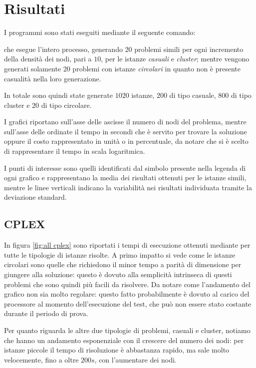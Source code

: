 \section{Risultati}
\label{sec:risultati}
I programmi sono stati eseguiti mediante il seguente comando:
\begin{quotation}
\end{quotation}
che esegue l'intero processo, generando 20 problemi simili per ogni incremento della densità dei nodi, pari a $10$, per le istanze \emph{casuali} e \emph{cluster}; mentre vengono generati solamente 20 problemi con istanze \emph{circolari} in quanto non è presente casualità nella loro generazione.

In totale sono quindi state generate $1020$ istanze, $200$ di tipo casuale, $800$ di tipo cluster e $20$ di tipo circolare.

I grafici riportano sull'asse delle ascisse il numero di nodi del problema, mentre sull'asse delle ordinate il tempo in secondi che è servito per trovare la soluzione oppure il costo rappresentato in unità o in percentuale, da notare che si è scelto di rappresentare il tempo in scala logaritmica.


I punti di interesse sono quelli identificati dal simbolo presente nella legenda di ogni grafico e rappresentano la media dei risultati ottenuti per le istanze simili, mentre le linee verticali indicano la variabilità nei risultati individuata tramite la deviazione standard.

\subsection{CPLEX}

In figura \ref{fig:all cplex} sono riportati i tempi di esecuzione ottenuti mediante  per tutte le tipologie di istanze risolte.
A primo impatto si vede come le istanze circolari sono quelle che richiedono il minor tempo a parità di dimensione per giungere alla soluzione: questo è dovuto alla semplicità intrinseca di questi problemi che sono quindi più facili da risolvere.
Da notare come l'andamento del grafico non sia molto regolare: questo fatto probabilmente è dovuto al carico del processore al momento dell'esecuzione del test, che può non essere stato costante durante il periodo di prova.

Per quanto riguarda le altre due tipologie di problemi, casuali e cluster, notiamo che hanno un andamento esponenziale con il crescere del numero dei nodi: per istanze piccole il tempo di risoluzione è abbastanza rapido, ma sale molto velocemente, fino a oltre $200s$, con l'aumentare dei nodi.

